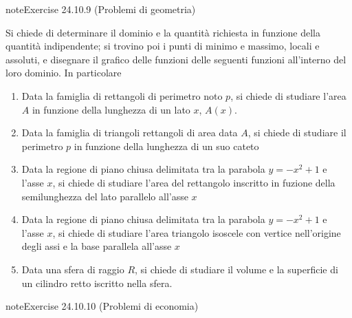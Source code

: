 \documentclass[letterpaper,10pt,italian]{jupyterBook}
\begin{document}
\begin{sphinxadmonition}{note}{Exercise 24.10.9 (Problemi di geometria)}



\sphinxAtStartPar
Si chiede di determinare il dominio e la quantità richiesta in funzione della quantità indipendente; si trovino poi i punti di minimo e massimo, locali e assoluti, e disegnare il grafico delle funzioni delle seguenti funzioni all’interno del loro dominio. In particolare
\begin{enumerate}
%
\item {} 
\sphinxAtStartPar
Data la famiglia di rettangoli di perimetro noto \(p\), si chiede di studiare l’area \(A\) in funzione della lunghezza di un lato \(x\), \(A(x)\).

\item {} 
\sphinxAtStartPar
Data la famiglia di triangoli rettangoli di area data \(A\), si chiede di studiare il perimetro \(p\) in funzione della lunghezza di un suo cateto

\item {} 
\sphinxAtStartPar
Data la regione di piano chiusa delimitata tra la parabola \(y = -x^2+1\) e l’asse \(x\), si chiede di studiare l’area del rettangolo inscritto in fuzione della semi\sphinxhyphen{}lunghezza del lato parallelo all’asse \(x\)

\item {} 
\sphinxAtStartPar
Data la regione di piano chiusa delimitata tra la parabola \(y = -x^2+1\) e l’asse \(x\), si chiede di studiare l’area triangolo isoscele con vertice nell’origine degli assi e la base parallela all’asse \(x\)

\item {} 
\sphinxAtStartPar
Data una sfera di raggio \(R\), si chiede di studiare il volume e la superficie di un cilindro retto iscritto nella sfera.

\end{enumerate}
\end{sphinxadmonition}
 \label{exercise:ch/infinitesimal_calculus/derivatives-problems-exercise-9}

\begin{sphinxadmonition}{note}{Exercise 24.10.10 (Problemi di economia)}



\sphinxAtStartPar
{}
\end{sphinxadmonition}
\end{document}
